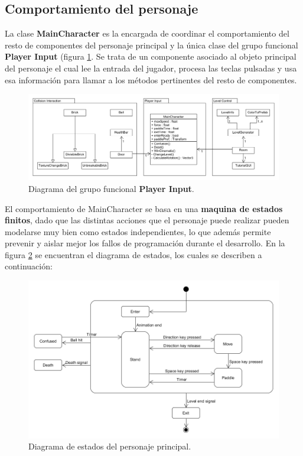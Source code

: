 \subsection{Comportamiento del personaje}
La clase \textbf{MainCharacter} es la encargada de coordinar el comportamiento del resto de componentes del personaje principal y la única clase del grupo funcional \textbf{Player Input} (figura \ref{diagrama_clases_jugador}. Se trata de un componente asociado al objeto principal del personaje el cual lee la entrada del jugador, procesa las teclas pulsadas y usa esa información para llamar a los métodos pertinentes del resto de componentes. 
\begin{figure}[!t]
    \centering
    \includegraphics[width=1\textwidth]{images/estructura/personaje/class_diagram}
    \caption{Diagrama del grupo funcional \textbf{Player Input}.}
    \label{diagrama_clases_jugador}
\end{figure}

El comportamiento de MainCharacter se basa en una \textbf{maquina de estados finitos}, dado que las distintas acciones que el personaje puede realizar pueden modelarse muy bien como estados independientes, lo que además permite prevenir y aislar mejor los fallos de programación durante el desarrollo. En la figura \ref{player_states} se encuentran el diagrama de estados, los cuales se describen a continuación:
\begin{figure}[h]
	\includegraphics[width=1\textwidth]{images/estructura/personaje/main_character_states}
	\centering
	\caption{Diagrama de estados del personaje principal.}
	\label{player_states}
\end{figure}

